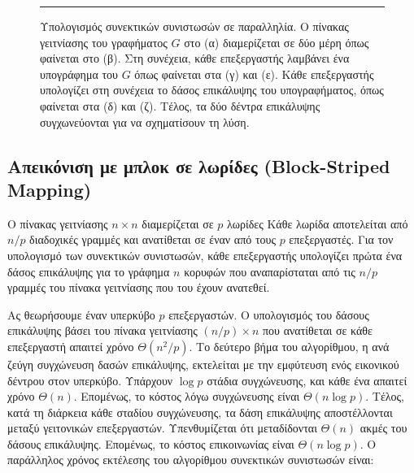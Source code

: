 \documentclass[12pt,a4paper]{article}
\begin{document}
\begin{figure}[H]
\begin{minipage}[b]{0.4\textwidth}
\end{minipage}
\vspace{0.3cm}

\noindent\rule{\textwidth}{0.2pt}
\caption{Υπολογισμός συνεκτικών συνιστωσών σε παραλληλία. Ο πίνακας
γειτνίασης του γραφήματος $G$ στο (α) διαμερίζεται σε δύο μέρη όπως
φαίνεται στο (β). Στη συνέχεια, κάθε επεξεργαστής λαμβάνει ένα
υπογράφημα του $G$ όπως φαίνεται στα (γ) και (ε). Κάθε επεξεργαστής
υπολογίζει στη συνέχεια το δάσος επικάλυψης του υπογραφήματος, όπως
φαίνεται στα (δ) και (ζ). Τέλος, τα δύο δέντρα επικάλυψης
συγχωνεύονται για να σχηματίσουν τη λύση.}
\label{fig:graph14}
\end{figure}
\vspace{0.3cm}
\subsection*{Απεικόνιση με μπλοκ σε λωρίδες (\foreignlanguage{english}{Block-Striped Mapping})}
Ο πίνακας γειτνίασης $n \times n$ διαμερίζεται σε $p$ λωρίδες 
Κάθε λωρίδα αποτελείται από $n/p$ διαδοχικές γραμμές 
και ανατίθεται σε έναν από τους $p$ επεξεργαστές. Για τον υπολογισμό 
των συνεκτικών συνιστωσών, κάθε επεξεργαστής υπολογίζει πρώτα ένα 
δάσος επικάλυψης για το γράφημα $n$ κορυφών που αναπαρίσταται από τις 
$n/p$ γραμμές του πίνακα γειτνίασης που του έχουν ανατεθεί.

Ας θεωρήσουμε έναν υπερκύβο $p$ επεξεργαστών. Ο υπολογισμός του
δάσους επικάλυψης βάσει του πίνακα γειτνίασης $(n/p) \times n$ που
ανατίθεται σε κάθε επεξεργαστή απαιτεί χρόνο $\Theta(n^2/p)$. Το
δεύτερο βήμα του αλγορίθμου, η ανά ζεύγη συγχώνευση δασών
επικάλυψης, εκτελείται με την εμφύτευση ενός εικονικού δέντρου στον
υπερκύβο. Υπάρχουν $\log p$ στάδια συγχώνευσης, και κάθε ένα
απαιτεί χρόνο $\Theta(n)$. Επομένως, το κόστος λόγω συγχώνευσης είναι
$\Theta(n \log p)$. Τέλος, κατά τη διάρκεια κάθε σταδίου συγχώνευσης,
τα δάση επικάλυψης αποστέλλονται μεταξύ γειτονικών επεξεργαστών.
Υπενθυμίζεται ότι μεταδίδονται $\Theta(n)$ ακμές του δάσους
επικάλυψης. Επομένως, το κόστος επικοινωνίας είναι $\Theta(n \log p)$.
Ο παράλληλος χρόνος εκτέλεσης του αλγορίθμου συνεκτικών συνιστωσών
είναι:
\end{document}
